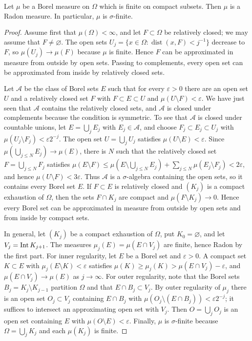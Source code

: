 \begin{proposition}\label{prop:borel-regularity}
Let $\mu$ be a Borel measure on $\Omega$ which is finite on compact subsets. Then $\mu$ is a Radon measure. In particular, $\mu$ is $\sigma$-finite.
\end{proposition}
\begin{proof}
Assume first that $\mu(\Omega)<\infty$, and let $F\subset\Omega$ be relatively closed; we may assume that $F\neq\varnothing$. The open sets $U_j=\{x\in\Omega:\operatorname{dist}(x,F)<j^{-1}\}$ decrease to $F$, so $\mu(U_j)\to\mu(F)$ because $\mu$ is finite. Hence $F$ can be approximated in measure from outside by open sets. Passing to complements, every open set can be approximated from inside by relatively closed sets.

Let $\mathcal A$ be the class of Borel sets $E$ such that for every $\varepsilon>0$ there are an open set $U$ and a relatively closed set $F$ with $F\subset E\subset U$ and $\mu(U\setminus F)<\varepsilon$. We have just seen that $\mathcal A$ contains the relatively closed sets, and $\mathcal A$ is closed under complements because the condition is symmetric. To see that $\mathcal A$ is closed under countable unions, let $E=\bigcup_jE_j$ with $E_j\in\mathcal A$, and choose $F_j\subset E_j\subset U_j$ with $\mu(U_j\setminus F_j)<\varepsilon2^{-j}$. The open set $U=\bigcup_jU_j$ satisfies $\mu(U\setminus E)<\varepsilon$. Since $\mu(\bigcup_{j\leq N}E_j)\to\mu(E)$, there is $N$ such that the relatively closed set $F=\bigcup_{j\leq N}F_j$ satisfies $\mu(E\setminus F)\leq\mu(E\setminus\bigcup_{j\leq N}E_j)+\sum_{j\leq N}\mu(E_j\setminus F_j)<2\varepsilon$, and hence $\mu(U\setminus F)<3\varepsilon$. Thus $\mathcal A$ is a $\sigma$-algebra containing the open sets, so it contains every Borel set $E$. If $F\subset E$ is relatively closed and $(K_j)$ is a compact exhaustion of $\Omega$, then the sets $F\cap K_j$ are compact and $\mu(F\setminus K_j)\to0$. Hence every Borel set can be approximated in measure from outside by open sets and from inside by compact sets.

In general, let $(K_j)$ be a compact exhaustion of $\Omega$, put $K_0=\varnothing$, and let $V_j=\operatorname{Int} K_{j+1}$. The measures $\mu_j(E)=\mu(E\cap V_j)$ are finite, hence Radon by the first part. For inner regularity, let $E$ be a Borel set and $\varepsilon>0$. A compact set $K\subset E$ with $\mu_j(E\setminus K)<\varepsilon$ satisfies $\mu(K)\geq\mu_j(K)>\mu(E\cap V_j)-\varepsilon$, and $\mu(E\cap V_j)\to\mu(E)$ as $j\to\infty$. For outer regularity, note that the Borel sets $B_j=K_j\setminus K_{j-1}$ partition $\Omega$ and that $E\cap B_j\subset V_j$. By outer regularity of $\mu_j$ there is an open set $O_j\subset V_j$ containing $E\cap B_j$ with $\mu(O_j\setminus(E\cap B_j))<\varepsilon2^{-j}$; it suffices to intersect an approximating open set with $V_j$. Then $O=\bigcup_jO_j$ is an open set containing $E$ with $\mu(O\setminus E)<\varepsilon$. Finally, $\mu$ is $\sigma$-finite because $\Omega=\bigcup_jK_j$ and each $\mu(K_j)$ is finite.
\end{proof}

